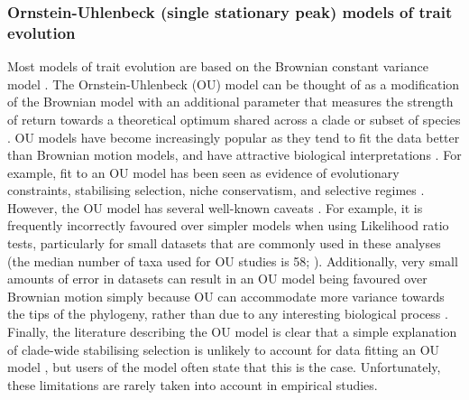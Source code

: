 \documentclass[a4paper,12pt]{article}
\begin{document}
\subsubsection{Ornstein-Uhlenbeck (single stationary peak) models of trait evolution}
Most models of trait evolution are based on the Brownian constant variance model \citep{cavalli1967,felsenstein1973maximum}.
The Ornstein-Uhlenbeck (OU) model can be thought of as a modification of the Brownian model with an additional parameter that measures the strength of return towards a theoretical optimum shared across a clade or subset of species \citep{hansen1997stabilizing,Butler:2004aa}.
OU models have become increasingly popular as they tend to fit the data better than Brownian motion models, and have attractive biological interpretations \citep{cooper2016}.
For example, fit to an OU model has been seen as evidence of evolutionary constraints, stabilising selection, niche conservatism, and selective regimes \citep{Wiens:2010aa,beaulieu2012modeling,christin2013anatomical,mahler2013exceptional}.
However, the OU model has several well-known caveats \citep[see][]{ives2010phylogenetic,boettiger2012your,hansen2012interpreting,ho2013asymptotic,ho2014intrinsic}. 
For example, it is frequently incorrectly favoured over simpler models when using Likelihood ratio tests, particularly for small datasets that are commonly used in these analyses (the median number of taxa used for OU studies is 58; \citealp{cooper2016}). 
Additionally, very small amounts of error in datasets can result in an OU model being favoured over Brownian motion simply because OU can accommodate more variance towards the tips of the phylogeny, rather than due to any interesting biological process \citep{boettiger2012your,pennell2015model}.
Finally, the literature describing the OU model is clear that a simple explanation of clade-wide stabilising selection is unlikely to account for data fitting an OU model \citep[e.g.][]{hansen1997stabilizing,hansen2005assessing}, but users of the model often state that this is the case.
Unfortunately, these limitations are rarely taken into account in empirical studies.
\end{document}

